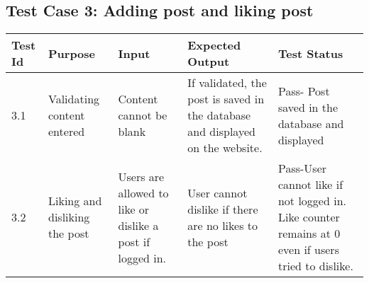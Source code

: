 \documentclass[12pt]{article}
\begin{document}
\subsection {Test Case 3: Adding post and liking post}
\begin{center}
	\begin{longtable}{ | p{2cm} | p{3cm} |  p{3cm} | p{3cm} | p{3cm} | }
		\hline
			\textbf{Test Id} & \textbf{Purpose} & \textbf{Input} & \textbf{Expected Output} & \textbf{Test Status} \\
		\hline
			3.1 & Validating content entered & Content cannot be blank & If validated, the post is saved in the database and displayed on the website. & Pass- Post saved in the database and displayed\\
		\hline
			3.2 & Liking and disliking the post & Users are allowed to like or dislike a post if logged in.  & User cannot dislike if there are no likes to the post & Pass-User cannot like if not logged in. Like counter remains at 0 even if users tried to dislike.\\
		\hline
	\end{longtable}
\end{center}

\pagebreak
\end{document}
